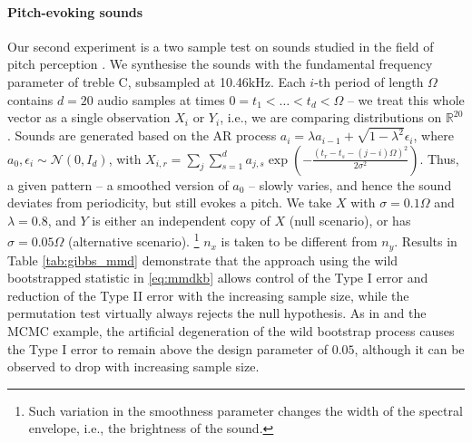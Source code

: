 \paragraph{Pitch-evoking sounds}
Our second experiment  is a two sample test on sounds studied in the field of pitch perception \cite{hehrmannthesis}. We synthesise the sounds with the fundamental frequency
parameter of treble C, subsampled at 10.46kHz. Each $i$-th period
of length $\Omega$ contains $d=20$ audio samples at times $0=t_{1}<\ldots<t_{d}<\Omega$
-- we treat this whole vector as a single observation $X_{i}$ or
$Y_{i}$, i.e., we are comparing distributions on $\mathbb{R}^{20}$.
Sounds are generated based on the AR process $a_{i}=\lambda a_{i-1}+\sqrt{1-\lambda^{2}}\epsilon_{i}$,
where $a_{0},\epsilon_{i}\sim\mathcal{N}(0,I_{d})$, with $X_{i,r}=\sum_{j}\sum_{s=1}^{d}a_{j,s}\exp\left(-\frac{\left(t_{r}-t_{s}-(j-i)\Omega\right)^{2}}{2\sigma^{2}}\right)$.
Thus, a given pattern -- a smoothed version of $a_{0}$ -- slowly
varies, and hence the sound deviates from
periodicity, but still evokes a pitch. We take
$X$ with $\sigma=0.1\Omega$
and $\lambda=0.8$, and $Y$ is either an independent copy of $X$
(null scenario), or has $\sigma=0.05\Omega$ (alternative scenario).%
\footnote{Such variation in the smoothness parameter changes the width of the
spectral envelope, i.e., the brightness of the sound.} $n_x$ is taken to be different from $n_y$. Results in Table \ref{tab:gibbs_mmd} demonstrate that the
approach using the wild bootstrapped statistic in \eqref{eq:mmdkb} allows control of the Type I error and reduction of the Type II error with the increasing sample size, while the permutation test
virtually always rejects the null hypothesis.
As in \cite{leucht_dependent_2013} and the MCMC example, the artificial degeneration of the wild bootstrap process causes the Type I error to remain above the design parameter of $0.05$, although it can be observed to drop with increasing sample size.

% 


